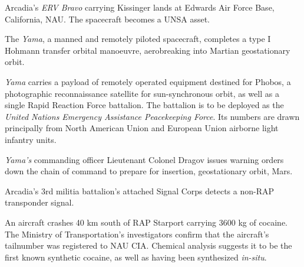 Arcadia's {\it ERV Bravo} carrying Kissinger lands at Edwards Air Force Base, California, NAU. The spacecraft becomes a UNSA asset.
\StopTimelineDate

The {\it Yama}, a manned and remotely piloted spacecraft, completes a type I Hohmann transfer orbital manoeuvre, aerobreaking into Martian geostationary orbit. 

{\it Yama} carries a payload of remotely operated equipment destined for Phobos, a photographic reconnaissance satellite for sun-synchronous orbit, as well as a single Rapid Reaction Force battalion. The battalion is to be deployed as the {\it United Nations Emergency Assistance Peacekeeping Force}. Its numbers are drawn principally from North American Union and European Union airborne light infantry units.
\StopTimelineDate

{\it Yama's} commanding officer Lieutenant Colonel Dragov issues warning orders down the chain of command to prepare for insertion, geostationary orbit, Mars.
\StopTimelineDate

Arcadia's 3rd militia battalion's attached Signal Corps detects a non-RAP transponder signal.
\StopTimelineDate

An aircraft crashes 40 km south of RAP Starport carrying 3600 kg of cocaine. The Ministry of Transportation's investigators confirm that the aircraft's tailnumber was registered to NAU CIA. Chemical analysis suggests it to be the first known synthetic cocaine, as well as having been synthesized {\it in-situ}.
\StopTimelineDate

\stoplines

\StopChapter

